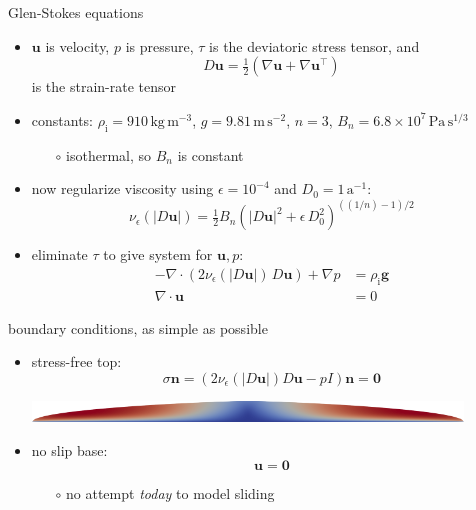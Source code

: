 \documentclass[10pt,
               hyperref={colorlinks,citecolor=DeepPink4,linkcolor=black,urlcolor=blue},
               svgnames]{beamer}
\newcommand{\bn}{\mathbf{n}}
\newcommand{\bu}{\mathbf{u}}
\newcommand{\bzero}{\mathbf{0}}
\newcommand{\grad}{\nabla}
\newcommand{\Div}{\nabla\cdot}
\newcommand{\eps}{\epsilon}
\newcommand{\rhoi}{\rho_{\text{i}}}
\begin{document}
\begin{frame}{Glen-Stokes equations}
\medskip
\begin{itemize}
\item $\bu$ is velocity, $p$ is pressure, $\tau$ is the deviatoric stress tensor, and
  $$D\bu=\tfrac{1}{2}\left(\grad \bu + \grad \bu^\top\right)$$
is the strain-rate tensor
\item constants: {\small $\rhoi=910 \,\text{kg}\,\text{m}^{-3}$, $g=9.81\,\text{m}\,\text{s}^{-2}$, $n=3$, $B_n=6.8\times 10^7\,\text{Pa}\,\text{s}^{1/3}$}
    \begin{itemize}
    \item[$\circ$] isothermal, so $B_n$ is constant
    \end{itemize}
\item now regularize viscosity using $\eps = 10^{-4}$ and $D_0 = 1\,\text{a}^{-1}$:
\begin{equation*}
\nu_\eps(|D\bu|) = \tfrac{1}{2} B_n \left(|D\bu|^2 + \eps\, D_0^2\right)^{((1/n) - 1)/2}
\end{equation*}
\item eliminate $\tau$ to give system for $\bu,p$:
\begin{align*}
- \nabla \cdot \left(2 \nu_\eps(|D\bu|)\, D\bu\right) + \nabla p &= \rhoi \mathbf{g} \\
\Div \bu &= 0
\end{align*}
\end{itemize}
\end{frame}


\begin{frame}{boundary conditions, as simple as possible}

\begin{itemize}
\item stress-free top:
\begin{equation*}
\sigma \bn = \left(2 \nu_\eps(|D\bu|) D\bu - pI\right) \bn = \bzero
\end{equation*}

\bigskip
\includegraphics[width=0.9\textwidth]{figs/speed.png}

\bigskip
\item no slip base:
\begin{equation*}
\bu = \bzero
\end{equation*}
    \begin{itemize}
    \item[$\circ$] no attempt \emph{today} to model sliding
    \end{itemize}
\end{itemize}
\end{frame}
\end{document}
